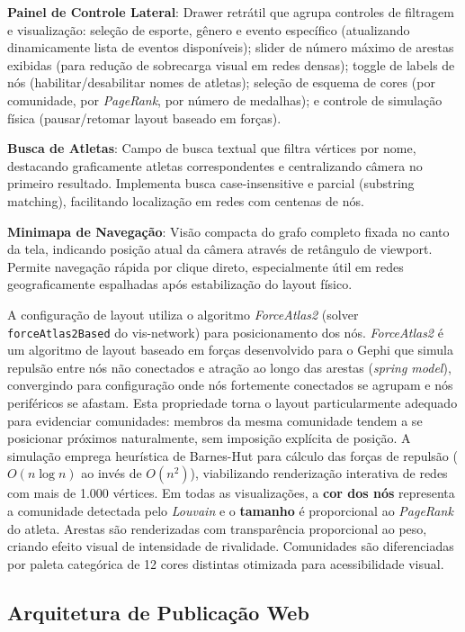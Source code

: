 \textbf{Painel de Controle Lateral}: Drawer retrátil que agrupa controles de filtragem e visualização: seleção de esporte, gênero e evento específico (atualizando dinamicamente lista de eventos disponíveis); slider de número máximo de arestas exibidas (para redução de sobrecarga visual em redes densas); toggle de labels de nós (habilitar/desabilitar nomes de atletas); seleção de esquema de cores (por comunidade, por \textit{PageRank}, por número de medalhas); e controle de simulação física (pausar/retomar layout baseado em forças).

\textbf{Busca de Atletas}: Campo de busca textual que filtra vértices por nome, destacando graficamente atletas correspondentes e centralizando câmera no primeiro resultado. Implementa busca case-insensitive e parcial (substring matching), facilitando localização em redes com centenas de nós.

\textbf{Minimapa de Navegação}: Visão compacta do grafo completo fixada no canto da tela, indicando posição atual da câmera através de retângulo de viewport. Permite navegação rápida por clique direto, especialmente útil em redes geograficamente espalhadas após estabilização do layout físico.

A configuração de layout utiliza o algoritmo \textit{ForceAtlas2} (solver \texttt{forceAtlas2Based} do vis-network) para posicionamento dos nós. \textit{ForceAtlas2} é um algoritmo de layout baseado em forças desenvolvido para o Gephi \cite{Jacomy2014ForceAtlas2} que simula repulsão entre nós não conectados e atração ao longo das arestas (\textit{spring model}), convergindo para configuração onde nós fortemente conectados se agrupam e nós periféricos se afastam. Esta propriedade torna o layout particularmente adequado para evidenciar comunidades: membros da mesma comunidade tendem a se posicionar próximos naturalmente, sem imposição explícita de posição. A simulação emprega heurística de Barnes-Hut para cálculo das forças de repulsão ($O(n \log n)$ ao invés de $O(n^2)$), viabilizando renderização interativa de redes com mais de 1.000 vértices. Em todas as visualizações, a \textbf{cor dos nós} representa a comunidade detectada pelo \textit{Louvain} e o \textbf{tamanho} é proporcional ao \textit{PageRank} do atleta. Arestas são renderizadas com transparência proporcional ao peso, criando efeito visual de intensidade de rivalidade. Comunidades são diferenciadas por paleta categórica de 12 cores distintas otimizada para acessibilidade visual.

\subsection{Arquitetura de Publicação Web}

